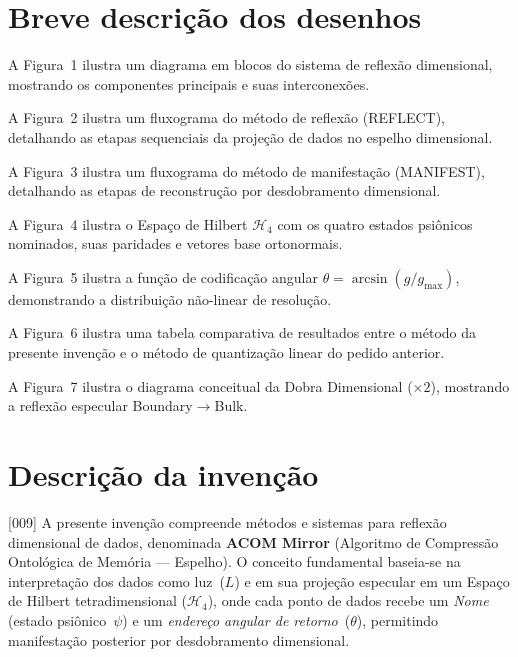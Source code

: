 \documentclass[12pt,a4paper]{article}
\newcommand{\Hfour}{\mathcal{H}_4}
\begin{document}
\section{Breve descrição dos desenhos}

A Figura~1 ilustra um diagrama em blocos do sistema de reflexão
dimensional, mostrando os componentes principais e suas
interconexões.

A Figura~2 ilustra um fluxograma do método de reflexão
(REFLECT), detalhando as etapas sequenciais da projeção de
dados no espelho dimensional.

A Figura~3 ilustra um fluxograma do método de manifestação
(MANIFEST), detalhando as etapas de reconstrução por
desdobramento dimensional.

A Figura~4 ilustra o Espaço de Hilbert $\Hfour$ com os quatro
estados psiônicos nominados, suas paridades e vetores base
ortonormais.

A Figura~5 ilustra a função de codificação angular
$\theta = \arcsin(g/g_{\max})$, demonstrando a distribuição
não-linear de resolução.

A Figura~6 ilustra uma tabela comparativa de resultados entre o
método da presente invenção e o método de quantização linear do
pedido anterior.

A Figura~7 ilustra o diagrama conceitual da Dobra Dimensional
($\times 2$), mostrando a reflexão especular
Boundary$\to$Bulk.

\section{Descrição da invenção}

{[009]} A presente invenção compreende métodos e sistemas para
reflexão dimensional de dados, denominada \textbf{ACOM Mirror}
(Algoritmo de Compressão Ontológica de Memória --- Espelho). O
conceito fundamental baseia-se na interpretação dos dados como
luz~($L$) e em sua projeção especular em um Espaço de Hilbert
tetradimensional ($\Hfour$), onde cada ponto de dados recebe um
\textit{Nome} (estado psiônico~$\psi$) e um \textit{endereço
angular de retorno}~($\theta$), permitindo manifestação
posterior por desdobramento dimensional.
\end{document}
